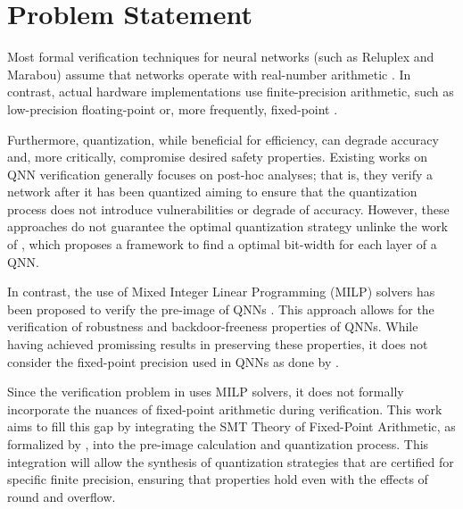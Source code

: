 \section{Problem Statement}

Most formal verification techniques for neural networks (such as Reluplex and Marabou) assume that networks operate with real-number arithmetic \cite{katz2017reluplex,amir2021smt}. In contrast, actual hardware implementations use finite-precision arithmetic, such as low-precision floating-point or, more frequently, fixed-point \cite{han2020understanding}.

Furthermore, quantization, while beneficial for efficiency, can degrade accuracy and, more critically, compromise desired safety properties. Existing works on QNN verification generally focuses on post-hoc analyses; that is, they verify a network after it has been quantized \cite{eleftheriadis2022neuralnetworkequivalencechecking,song2023qnnrepair,katz2017reluplex,baranowski2020smt, Pulina2012Challenging, cordeiro2025neuralnetworkverificationprogramming} aiming to ensure that the quantization process does not introduce vulnerabilities or degrade of accuracy. However, these approaches do not guarantee the optimal quantization strategy unlinke the work of \cite{abdi2021counterexample,cai2025certified}, which proposes a framework to find a optimal bit-width for each layer of a QNN.

In contrast, the use of Mixed Integer Linear Programming (MILP) solvers has been proposed to verify the pre-image of QNNs \cite{cai2025certified}. This approach allows for the verification of robustness and backdoor-freeness properties of QNNs. While having achieved promissing results in preserving these properties, it does not consider the fixed-point precision used in QNNs as done by \cite{baranowski2020smt}.

Since the verification problem in \cite{cai2025certified} uses MILP solvers, it does not formally incorporate the nuances of fixed-point arithmetic during verification. This work aims to fill this gap by integrating the SMT Theory of Fixed-Point Arithmetic, as formalized by \cite{baranowski2020smt}, into the pre-image calculation and quantization process. This integration will allow the synthesis of quantization strategies that are certified for specific finite precision, ensuring that properties hold even with the effects of round and overflow.

